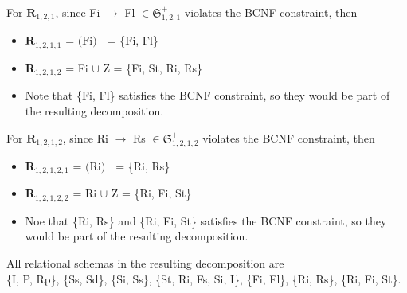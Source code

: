 \documentclass[12pt]{article}
\begin{document}
\begin{enumerate}
        For $\textbf{R}_{1,2,1}$, since Fi $\longrightarrow$ Fl $\in
        \mathfrak{S}_{1,2,1}^+$ violates the BCNF constraint, then
        \begin{itemize}
          \item $\textbf{R}_{1,2,1,1}$ = $\text{(Fi)}^+$
                                       = \{Fi, Fl\}
          \item $\textbf{R}_{1,2,1,2}$ = Fi $\cup$ Z
                                       = \{Fi, St, Ri, Rs\}
          \item Note that \{Fi, Fl\} satisfies the BCNF constraint, so they
                would be part of the resulting decomposition.
        \end{itemize}

        For $\textbf{R}_{1,2,1,2}$, since Ri $\longrightarrow$ Rs $\in
        \mathfrak{S}_{1,2,1,2}^+$ violates the BCNF constraint, then
        \begin{itemize}
          \item $\textbf{R}_{1,2,1,2,1}$ = $\text{(Ri)}^+$
                                         = \{Ri, Rs\}
          \item $\textbf{R}_{1,2,1,2,2}$ = Ri $\cup$ Z
                                         = \{Ri, Fi, St\}
          \item Noe that \{Ri, Rs\} and \{Ri, Fi, St\} satisfies the BCNF
                constraint, so they would be part of the resulting
                decomposition.
        \end{itemize}

        All relational schemas in the resulting decomposition are \\
        \{I, P, Rp\}, \{Ss, Sd\}, \{Si, Ss\}, \{St, Ri, Fs, Si, I\}, \{Fi, Fl\},
        \{Ri, Rs\}, \{Ri, Fi, St\}. \\


\end{enumerate}
\end{document}
